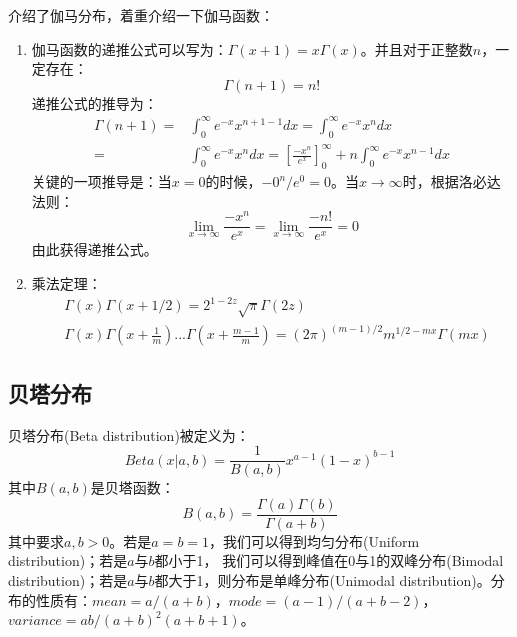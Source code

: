 \documentclass[UTF8, 12pt]{ctexart}
\begin{document}
	介绍了伽马分布，着重介绍一下伽马函数：
	\begin{enumerate}
		\item 伽马函数的递推公式可以写为：$\Gamma(x + 1) = x \Gamma(x)$。并且对于正整数$n$，一定存在：
		\begin{equation}
			\Gamma(n + 1) = n!
		\end{equation}
		递推公式的推导为：
		\begin{align}
			\Gamma(n + 1) = & \int_{0}^{\infty}{ e^{-x} x^{n + 1 - 1} }dx = \int_{0}^{\infty} {e^{-x} x^{n}}dx \\
						  = & \int_{0}^{\infty} {e^{-x} x^{n}}dx = [\frac{-x^{n}}{e^{x}}]_{0}^{\infty} + n\int_{0}^{\infty} {e^{-x} x^{n-1}}dx
		\end{align}
		关键的一项推导是：当$x = 0$的时候，$-0^{n}/e^{0} = 0$。当$x \rightarrow \infty$时，根据洛必达法则：
		\begin{equation}
			\lim\limits_{x \rightarrow \infty} \frac{-x^{n}}{e^{x}} = \lim\limits_{x \rightarrow \infty} \frac{-n!}{e^{x}} = 0
		\end{equation}
		由此获得递推公式。
		\item 乘法定理：
		\begin{align}
			& \Gamma(x)\Gamma(x + 1/2) = 2^{1 - 2z} \sqrt{\pi} \Gamma(2z) \\
			& \Gamma(x)\Gamma(x + \frac{1}{m})...\Gamma(x + \frac{m - 1}{m}) = (2\pi)^{(m-1)/2} m^{1/2 - mx} \Gamma(mx)
		\end{align}
	\end{enumerate}

\subsection{贝塔分布}
	贝塔分布(Beta distribution)被定义为：
	\begin{equation}
		Beta(x|a, b) = \frac{1}{B(a, b)} x^{a-1}(1-x)^{b-1}
	\end{equation}
	其中$B(a, b)$是贝塔函数：
	\begin{equation}
		B(a, b) = \frac{\Gamma(a)\Gamma(b)}{\Gamma(a + b)}
	\end{equation}
	其中要求$a, b > 0$。若是$a = b = 1$，我们可以得到均匀分布(Uniform distribution)；若是$a$与$b$都小于1， 我们可以得到峰值在0与1的双峰分布(Bimodal distribution)；若是$a$与$b$都大于1，则分布是单峰分布(Unimodal distribution)。分布的性质有：$mean = a/(a + b)$，$mode = (a - 1)/(a + b - 2)$，$variance = ab/(a + b)^2(a + b + 1)$。
	
%  
%  
\end{document}
